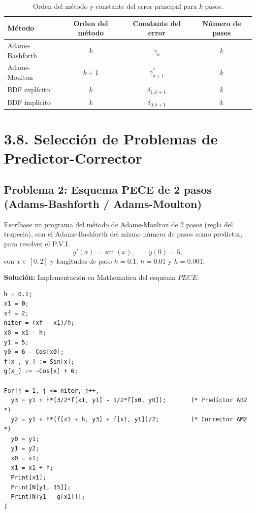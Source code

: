 \begin{table}[htbp]
    \centering
    \caption{Orden del método y constante del error principal para $k$ pasos.}
    \label{tab:orden_multipaso}
    \renewcommand{\arraystretch}{1.3}
    \begin{tabular}{lccc}
        \toprule
        \textbf{Método} & \textbf{Orden del método} & \textbf{Constante del error} & \textbf{Número de pasos} \\
        \midrule
        Adams-Bashforth & $k$ & $\gamma_k$ & $k$ \\
        Adams-Moulton & $k+1$ & $\gamma_{k+1}^*$ & $k$ \\
        BDF explícito & $k$ & $\delta_{1, k+1}$ & $k$ \\
        BDF implícito & $k$ & $\delta_{0, k+1}$ & $k$ \\
        \bottomrule
    \end{tabular}
\end{table}

\section*{3.8. Selección de Problemas de Predictor-Corrector}

\subsection*{Problema 2: Esquema PECE de 2 pasos (Adams-Bashforth / Adams-Moulton)}

Escríbase un programa del método de Adams-Moulton de 2 pasos (regla del trapecio), con el Adams-Bashforth del mismo número de pasos como predictor, para resolver el P.V.I.
\begin{equation*}
    y'(x) = \sin(x), \qquad y(0) = 5,
    \tag{3.8.1}
\end{equation*}
con $x \in [0, 2]$ y longitudes de paso $h = 0.1$, $h = 0.01$ y $h = 0.001$.

\textbf{Solución:} Implementación en Mathematica del esquema $PECE$:

\begin{lstlisting}
h = 0.1;
x1 = 0;
xf = 2;
niter = (xf - x1)/h;
x0 = x1 - h;
y1 = 5;
y0 = 6 - Cos[x0];
f[x_, y_] := Sin[x];
g[x_] := -Cos[x] + 6;

For[j = 1, j <= niter, j++,
  y3 = y1 + h*(3/2*f[x1, y1] - 1/2*f[x0, y0]);       (* Predictor AB2 *)
  y2 = y1 + h*(f[x1 + h, y3] + f[x1, y1])/2;         (* Corrector AM2 *)
  y0 = y1;
  y1 = y2;
  x0 = x1;
  x1 = x1 + h;
  Print[x1];
  Print[N[y1, 15]];
  Print[N[y1 - g[x1]]];
]
\end{lstlisting}

